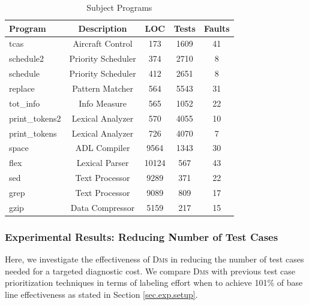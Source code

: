 \begin{table}[!htbp]
	\centering
	\caption{Subject Programs}
	\renewcommand{\arraystretch}{1.5}
	\small
    \begin{tabular}{|l|c|c|c|c|} \hline
        Program & Description & LOC  & Tests & Faults\\ \hline\hline
		tcas & Aircraft Control & 173 & 1609 & 41\\ \hline
        schedule2 & Priority Scheduler & 374  & 2710  & 8\\ \hline
        schedule & Priority Scheduler & 412 & 2651  & 8\\ \hline
        replace & Pattern Matcher & 564 & 5543  & 31\\ \hline
		tot\_info & Info Measure & 565 & 1052  & 22\\ \hline
        print\_tokens2 & Lexical Analyzer & 570  & 4055  & 10\\ \hline
        print\_tokens & Lexical Analyzer & 726 & 4070  & 7\\ \hline
        space & ADL Compiler & 9564 & 1343 & 30\\ \hline
        flex & Lexical Parser & 10124 & 567  & 43\\ \hline
        sed & Text Processor & 9289  & 371  & 22\\ \hline
        grep & Text Processor & 9089 & 809  & 17\\ \hline
        gzip & Data Compressor & 5159 & 217  & 15\\ \hline
	\end{tabular}
	\label{dataset}
\end{table}

\subsubsection{Experimental Results: Reducing Number of Test Cases}\label{sec.exp.resultsA}


Here, we investigate the effectiveness of \textsc{Dms} in reducing the number of test cases needed for a targeted diagnostic cost. We compare \textsc{Dms} with previous test case prioritization techniques in terms of labeling effort when to achieve 101\% of base line effectiveness as stated in Section \ref{sec.exp.setup}.


